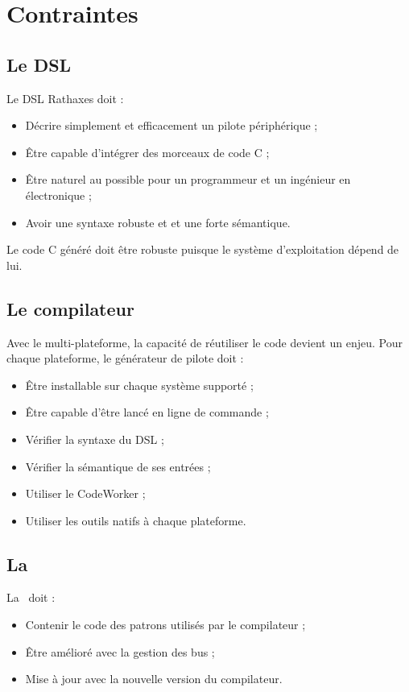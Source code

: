 \section{Contraintes}

\subsection{Le DSL}

Le DSL Rathaxes doit :
\begin{itemize}
\item Décrire simplement et efficacement un pilote périphérique ;
\item Être capable d'intégrer des morceaux de code C ;
\item Être naturel au possible pour un programmeur et un ingénieur en
électronique ;
\item Avoir une syntaxe robuste et et une forte sémantique.
\end{itemize}

Le code C généré doit être robuste puisque le système d'exploitation dépend de lui.

\subsection{Le compilateur}

Avec le multi-plateforme, la capacité de réutiliser le code devient un enjeu.
Pour chaque plateforme, le générateur de pilote doit :
\begin{itemize}
\item Être installable sur chaque système supporté ;
\item Être capable d'être lancé en ligne de commande ;
\item Vérifier la syntaxe du DSL ;
\item Vérifier la sémantique de ses entrées ;
\item Utiliser le CodeWorker\cite{CodeWorker} ;
\item Utiliser les outils natifs \`a chaque plateforme.
\end{itemize}

\subsection{La \BL}

La \BL\ doit :
\begin{itemize}
\item Contenir le code des patrons utilisés par le compilateur ;
\item Être amélioré avec la gestion des bus ;
\item Mise \`a jour avec la nouvelle version du compilateur.
\end{itemize}

